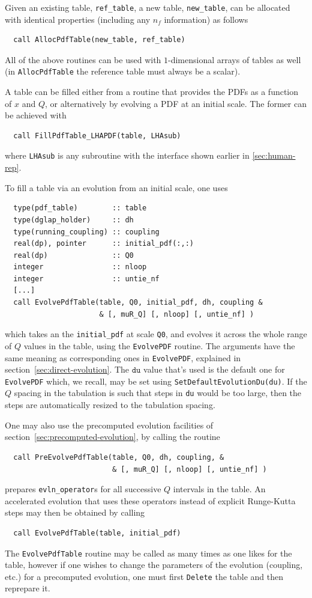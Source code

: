 \documentclass[12pt]{article}
\newcommand{\ttt}[1]{\texttt{#1}}
\begin{document}
Given an existing table, \ttt{ref\_table}, a new table,
\ttt{new\_table}, can be allocated with identical properties
(including any $n_f$ information) as follows
\begin{verbatim}
  call AllocPdfTable(new_table, ref_table)
\end{verbatim}
All of the above routines can be used with $1$-dimensional arrays of
tables as well (in \ttt{AllocPdfTable} the reference table must always
be a scalar).

A table can be filled either from a routine that provides the PDFs as
a function of $x$ and $Q$, or alternatively by evolving a PDF at an
initial scale. The former can be achieved with
\begin{verbatim}
  call FillPdfTable_LHAPDF(table, LHAsub)
\end{verbatim}
where \ttt{LHAsub} is any subroutine with the interface shown earlier
in \ref{sec:human-rep}.

To fill a table via an evolution from an initial scale, one uses 
\begin{verbatim}
  type(pdf_table)        :: table
  type(dglap_holder)     :: dh
  type(running_coupling) :: coupling
  real(dp), pointer      :: initial_pdf(:,:)
  real(dp)               :: Q0
  integer                :: nloop
  integer                :: untie_nf
  [...]
  call EvolvePdfTable(table, Q0, initial_pdf, dh, coupling &
                      & [, muR_Q] [, nloop] [, untie_nf] )
\end{verbatim}
which takes an the \ttt{initial\_pdf} at scale \ttt{Q0}, and evolves
it across the whole range of $Q$ values in the table, using the
\ttt{EvolvePDF} routine. The arguments have the same meaning as
corresponding ones in \ttt{EvolvePDF}, explained in
section~\ref{sec:direct-evolution}. The $\ttt{du}$ value that's used
is the default one for \ttt{EvolvePDF} which, we recall, may be set
using \ttt{SetDefaultEvolutionDu(du)}. If the $Q$ spacing in the
tabulation is such that steps in \ttt{du} would be too large, then the
steps are automatically resized to the tabulation spacing.

One may also use the precomputed evolution facilities of
section~\ref{sec:precomputed-evolution}, by calling the routine
\begin{verbatim}
  call PreEvolvePdfTable(table, Q0, dh, coupling, &
                         & [, muR_Q] [, nloop] [, untie_nf] )
\end{verbatim}
prepares \ttt{evln\_operator}s for all successive $Q$ intervals in the
table. An accelerated evolution that uses these operators instead of
explicit Runge-Kutta steps may then be obtained by calling
\begin{verbatim}
  call EvolvePdfTable(table, initial_pdf)
\end{verbatim}
The \ttt{EvolvePdfTable} routine may be called as many times as one
likes for the table, however if one wishes to change the parameters of
the evolution (coupling, etc.) for a precomputed evolution, one must
first \ttt{Delete} the table and then reprepare it.
\end{document}

